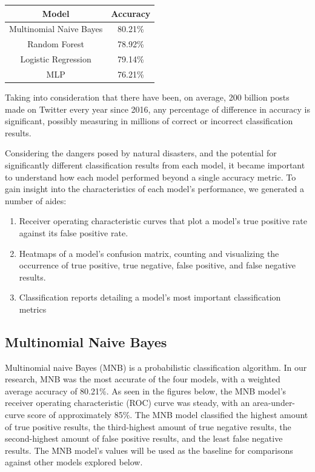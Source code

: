 \documentclass[11pt]{diazessay} %
\begin{document}
\begin{center}
\begin{tabular}{ |c|c| }
  Model & Accuracy\\
  \hline
  Multinomial Naive Bayes & 80.21\%\\
  Random Forest & 78.92\%\\
  Logistic Regression & 79.14\%\\
  MLP & 76.21\%\\
\end{tabular}
\end{center}

Taking into consideration that there have been, on average, 200 billion posts made on Twitter every year since 2016, any percentage of difference in accuracy is significant, possibly measuring in millions of correct or incorrect classification results.

Considering the dangers posed by natural disasters, and the potential for significantly different classification results from each model, it became important to understand how each model performed beyond a single accuracy metric. To gain insight into the characteristics of each model's performance, we generated a number of aides:
\begin{enumerate}
  \item Receiver operating characteristic curves that plot a model's true positive rate against its false positive rate.
  \item Heatmaps of a model's confusion matrix, counting and visualizing the occurrence of true positive, true negative, false positive, and false negative results.
  \item Classification reports detailing a model's most important classification metrics
\end{enumerate}



\subsection{Multinomial Naive Bayes}

Multinomial naive Bayes (MNB) is a probabilistic classification algorithm. In our research, MNB was the most accurate of the four models, with a weighted average accuracy of 80.21\%. As seen in the figures below, the MNB model's receiver operating characteristic (ROC) curve was steady, with an area-under-curve score of approximately 85\%. The MNB model classified the highest amount of true positive results, the third-highest amount of true negative results, the second-highest amount of false positive results, and the least false negative results. The MNB model's values will be used as the baseline for comparisons against other models explored below.
\end{document}
